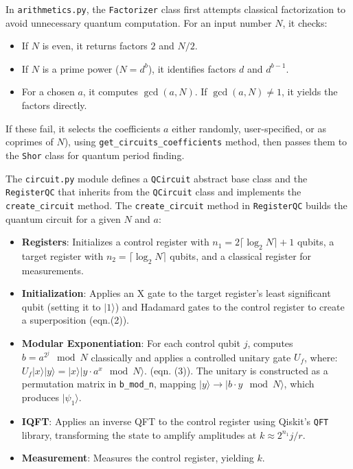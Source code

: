 \documentclass[conference,twoside]{IEEEtran}
\begin{document}
In \texttt{arithmetics.py}, the \texttt{Factorizer} class first attempts classical factorization to avoid unnecessary quantum computation. For an input number \( N \), it checks:
\begin{itemize}
    \item If \( N \) is even, it returns factors \( 2 \) and \( N/2 \).
    \item If \( N \) is a prime power (\( N = d^b \)), it identifies factors \( d \) and \( d^{b-1} \).
    \item For a chosen \( a \), it computes \( \gcd(a, N) \). If \( \gcd(a, N) \neq 1 \), it yields the factors directly.
\end{itemize}
If these fail, it selects the coefficients $a$ either randomly, user-specified, or as coprimes of \( N \)), using \texttt{get\_circuits\_coefficients} method, then passes them to the \texttt{Shor} class for quantum period finding.

The \texttt{circuit.py} module defines a \texttt{QCircuit} abstract base class and the \texttt{RegisterQC} that inherits from the \texttt{QCircuit} class and implements the \texttt{create\_circuit} method. The \texttt{create\_circuit} method in \texttt{RegisterQC} builds the quantum circuit for a given \( N \) and \( a \):
\begin{itemize}
    \item \textbf{Registers}: Initializes a control register with \( n_1 = 2 \lceil \log_2 N \rceil + 1 \) qubits, a target register with \( n_2 = \lceil \log_2 N \rceil \) qubits, and a classical register for measurements.
    \item \textbf{Initialization}: Applies an X gate to the target register’s least significant qubit (setting it to \( |1\rangle \)) and Hadamard gates to the control register to create a superposition (eqn.(2)).
    \item \textbf{Modular Exponentiation}: For each control qubit \( j \), computes \( b = a^{2^j} \mod N \) classically and applies a controlled unitary gate \( U_f \), where: \(U_f |x\rangle |y\rangle = |x\rangle |y \cdot a^{x} \mod N\rangle.\) (eqn. (3)).
    The unitary is constructed as a permutation matrix in \texttt{b\_mod\_n}, mapping \( |y\rangle \to |b \cdot y \mod N\rangle \), which produces \(|\psi_1\rangle \).
    \item \textbf{IQFT}: Applies an inverse QFT to the control register using Qiskit’s \texttt{QFT} library, transforming the state to amplify amplitudes at \( k \approx 2^{n_1} j / r \).
    \item \textbf{Measurement}: Measures the control register, yielding \( k \).
\end{itemize}
\end{document}
